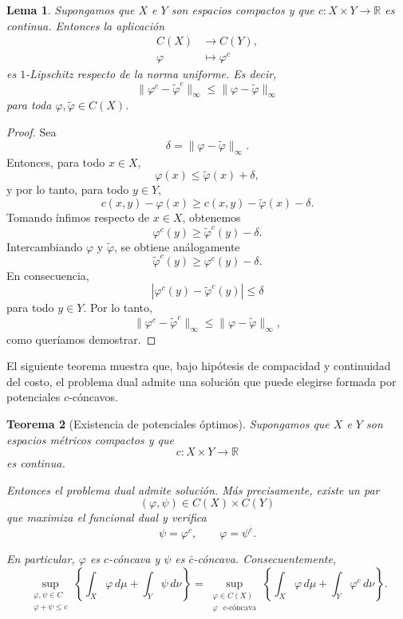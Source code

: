 \documentclass[12pt, a4paper]{amsbook}
\newcommand{\R}{{\mathbb R}}
\newtheorem{teo}{Teorema}[section]
\newtheorem{lema}[teo]{Lema}
\theoremstyle{remark}
\theoremstyle{definition}
\numberwithin{section}{chapter}
\numberwithin{subsection}{section}
\numberwithin{equation}{section}
\numberwithin{figure}{chapter}
\begin{document}
\begin{lema}\label{lema.ctransf.contraccion}
Supongamos que $X$ e $Y$ son espacios compactos y que
$c\colon X\times Y\longrightarrow\R$ es continua.
Entonces la aplicación
\[
\begin{aligned}
C(X)&\longrightarrow C(Y),\\
\varphi&\longmapsto\varphi^c
\end{aligned}
\]
es $1$-Lipschitz respecto de la norma uniforme. Es decir,
\[
\|\varphi^c-\widetilde\varphi^c\|_\infty
\leq
\|\varphi-\widetilde\varphi\|_\infty
\]
para toda $\varphi,\widetilde\varphi\in C(X)$.
\end{lema}

\begin{proof}
Sea
\[
\delta=\|\varphi-\widetilde\varphi\|_\infty.
\]
Entonces, para todo $x\in X$,
\[
\varphi(x)\leq\widetilde\varphi(x)+\delta,
\]
y por lo tanto, para todo $y\in Y$,
\[
c(x,y)-\varphi(x)
\geq
c(x,y)-\widetilde\varphi(x)-\delta.
\]
Tomando ínfimos respecto de $x\in X$, obtenemos
\[
\varphi^c(y)
\geq
\widetilde\varphi^c(y)-\delta.
\]
Intercambiando $\varphi$ y $\widetilde\varphi$, se obtiene análogamente
\[
\widetilde\varphi^c(y)
\geq
\varphi^c(y)-\delta.
\]
En consecuencia,
\[
|\varphi^c(y)-\widetilde\varphi^c(y)|
\leq
\delta
\]
para todo $y\in Y$. Por lo tanto,
\[
\|\varphi^c-\widetilde\varphi^c\|_\infty
\leq
\|\varphi-\widetilde\varphi\|_\infty,
\]
como queríamos demostrar.
\end{proof}


El siguiente teorema muestra que, bajo hipótesis de compacidad y continuidad
del costo, el problema dual admite una solución que puede elegirse formada
por potenciales \(c\)-cóncavos.

\begin{teo}[Existencia de potenciales óptimos]\label{teo.existencia.potenciales}
Supongamos que \(X\) e \(Y\) son espacios métricos compactos y que
\[
c\colon X\times Y\longrightarrow\R
\]
es continua.

Entonces el problema dual admite solución. Más precisamente, existe un par
\[
(\varphi,\psi)\in C(X)\times C(Y)
\]
que maximiza el funcional dual y verifica
\[
\psi=\varphi^c,
\qquad
\varphi=\psi^{\bar c}.
\]

En particular, $\varphi$ es $c$-cóncava y $\psi$ es
$\bar c$-cóncava.
Consecuentemente,
\[
\sup_{\substack{\varphi,\psi\in C\\
\varphi+\psi\le c}}
\left\{
\int_X\varphi\,d\mu
+
\int_Y\psi\,d\nu
\right\}
=
\sup_{\substack{\varphi\in C(X)\\
\varphi\text{ $c$-cóncava}}}
\left\{
\int_X\varphi\,d\mu
+
\int_Y\varphi^c\,d\nu
\right\}.
\]
\end{teo}
\end{document}
